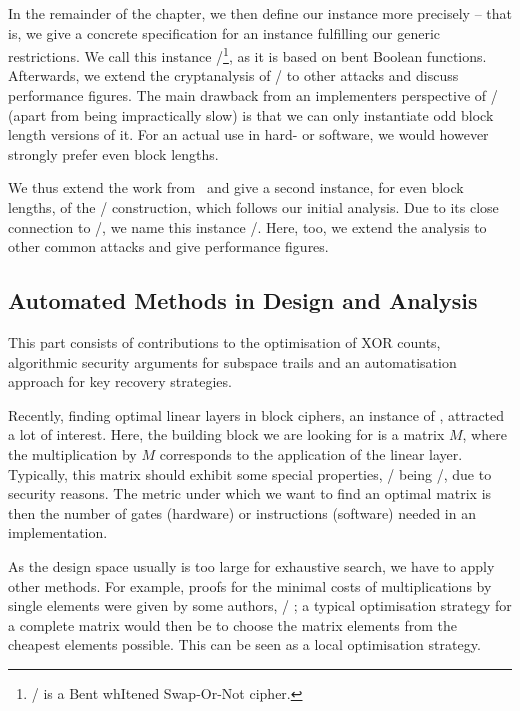 In the remainder of the chapter, we then define our instance more precisely -- that is, we give a concrete specification for an instance fulfilling our generic restrictions.
We call this instance \bison/\footnote{%
    \bison/ is a Bent whItened Swap-Or-Not cipher.
}, as it is based on bent Boolean functions.
Afterwards, we extend the cryptanalysis of \bison/ to other attacks and discuss performance figures.
The main drawback from an implementers perspective of \bison/ (apart from being impractically slow) is that we can only instantiate odd block length versions of it.
For an actual use in hard- or software, we would however strongly prefer even block lengths.

We thus extend the work from~\cite{EC:CLLNW19} and give a second instance, for even block lengths, of the \WSN/ construction, which follows our initial analysis.
Due to its close connection to \bison/, we name this instance \wisent/.
Here, too, we extend the analysis to other common attacks and give performance figures.

\subsection{Automated Methods in Design and Analysis}%
This part consists of contributions to the optimisation of XOR counts, algorithmic security arguments for subspace trails and an automatisation approach for key recovery strategies.

Recently, finding optimal linear layers in block ciphers, an instance of , attracted a lot of interest.
Here, the building block we are looking for is a matrix $M$, where the multiplication by $M$ corresponds to the application of the linear layer.
Typically, this matrix should exhibit some special properties, \eg/ being \MDS/, due to security reasons.
The metric under which we want to find an optimal matrix is then the number of gates (hardware) or instructions (software) needed in an implementation.

As the design space usually is too large for exhaustive search, we have to apply other methods.
For example, proofs for the minimal costs of multiplications by single elements were given by some authors, \eg/ \textcite{C:BeiKraLea16,EC:Kolsch19}; a typical optimisation strategy for a complete matrix would then be to choose the matrix elements from the cheapest elements possible.
This can be seen as a local optimisation strategy.

